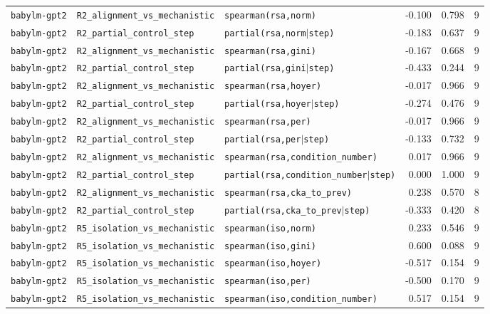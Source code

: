 \begin{longtable}{lllrrr}
\texttt{babylm-gpt2} & \texttt{R2\_alignment\_vs\_mechanistic} & \texttt{spearman(rsa,norm)} & -0.100 & 0.798 & 9 \\
\texttt{babylm-gpt2} & \texttt{R2\_partial\_control\_step} & \texttt{partial(rsa,norm$\mid$step)} & -0.183 & 0.637 & 9 \\
\texttt{babylm-gpt2} & \texttt{R2\_alignment\_vs\_mechanistic} & \texttt{spearman(rsa,gini)} & -0.167 & 0.668 & 9 \\
\texttt{babylm-gpt2} & \texttt{R2\_partial\_control\_step} & \texttt{partial(rsa,gini$\mid$step)} & -0.433 & 0.244 & 9 \\
\texttt{babylm-gpt2} & \texttt{R2\_alignment\_vs\_mechanistic} & \texttt{spearman(rsa,hoyer)} & -0.017 & 0.966 & 9 \\
\texttt{babylm-gpt2} & \texttt{R2\_partial\_control\_step} & \texttt{partial(rsa,hoyer$\mid$step)} & -0.274 & 0.476 & 9 \\
\texttt{babylm-gpt2} & \texttt{R2\_alignment\_vs\_mechanistic} & \texttt{spearman(rsa,per)} & -0.017 & 0.966 & 9 \\
\texttt{babylm-gpt2} & \texttt{R2\_partial\_control\_step} & \texttt{partial(rsa,per$\mid$step)} & -0.133 & 0.732 & 9 \\
\texttt{babylm-gpt2} & \texttt{R2\_alignment\_vs\_mechanistic} & \texttt{spearman(rsa,condition\_number)} & 0.017 & 0.966 & 9 \\
\texttt{babylm-gpt2} & \texttt{R2\_partial\_control\_step} & \texttt{partial(rsa,condition\_number$\mid$step)} & 0.000 & 1.000 & 9 \\
\texttt{babylm-gpt2} & \texttt{R2\_alignment\_vs\_mechanistic} & \texttt{spearman(rsa,cka\_to\_prev)} & 0.238 & 0.570 & 8 \\
\texttt{babylm-gpt2} & \texttt{R2\_partial\_control\_step} & \texttt{partial(rsa,cka\_to\_prev$\mid$step)} & -0.333 & 0.420 & 8 \\
\texttt{babylm-gpt2} & \texttt{R5\_isolation\_vs\_mechanistic} & \texttt{spearman(iso,norm)} & 0.233 & 0.546 & 9 \\
\texttt{babylm-gpt2} & \texttt{R5\_isolation\_vs\_mechanistic} & \texttt{spearman(iso,gini)} & 0.600 & 0.088 & 9 \\
\texttt{babylm-gpt2} & \texttt{R5\_isolation\_vs\_mechanistic} & \texttt{spearman(iso,hoyer)} & -0.517 & 0.154 & 9 \\
\texttt{babylm-gpt2} & \texttt{R5\_isolation\_vs\_mechanistic} & \texttt{spearman(iso,per)} & -0.500 & 0.170 & 9 \\
\texttt{babylm-gpt2} & \texttt{R5\_isolation\_vs\_mechanistic} & \texttt{spearman(iso,condition\_number)} & 0.517 & 0.154 & 9 \\

\end{longtable}
